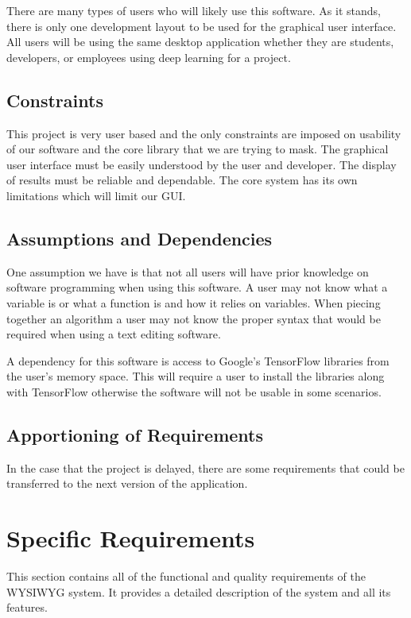 \documentclass[a4paper,10pt]{article} \usepackage[margin=1.0in]{geometry} \usepackage{pdfpages} \usepackage{graphicx}
\begin{document}
There are many types of users who will likely use this software. 
As it stands, there is only one development layout to be used for the graphical user interface.
All users will be using the same desktop application whether they are students, developers, or employees using deep learning for a project.

\subsection{Constraints}

This project is very user based and the only constraints are imposed on usability of our software and the core library that we are trying to mask.
The graphical user interface must be easily understood by the user and developer.
The display of results must be reliable and dependable.
The core system has its own limitations which will limit our GUI.

\subsection{Assumptions and Dependencies}

One assumption we have is that not all users will have prior knowledge on software programming when using this software.
A user may not know what a variable is or what a function is and how it relies on variables. 
When piecing together an algorithm a user may not know the proper syntax that would be required when using a text editing software.

A dependency for this software is access to Google's TensorFlow libraries from the user's memory space. 
This will require a user to install the libraries along with TensorFlow otherwise the software will not be usable in some scenarios.

\subsection{Apportioning of Requirements}

In the case that the project is delayed, there are some requirements that could be transferred to the next version of the application. 

\newpage

\section{Specific Requirements}

This section contains all of the functional and quality requirements of the WYSIWYG system. 
It provides a detailed description of the system and all its features.
\end{document}
